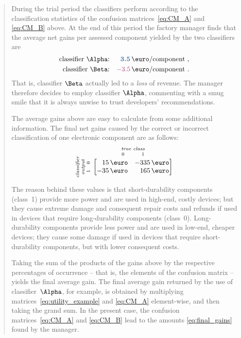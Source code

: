 \documentclass[\ifafour a4paper,12pt,\else a5paper,10pt,\fi%
onecolumn,oneside,article,%
british%
]{memoir}
\theoremstyle{remark}
\theoremstyle{innote}
\renewcommand*{\|}[1][]{\nonscript\:#1\vert\nonscript\:\mathopen{}}
\newcommand*{\good}[1]{\ensuremath{{\color{mypurpleblue}\bm{#1}}}}
\newcommand*{\bad}[1]{\ensuremath{{\color{myredpurple}#1}}}
\begin{document}
\begin{quotation}
During the trial period the classifiers perform according to the classification statistics of the confusion matrices~\eqref{eq:CM_A} and \eqref{eq:CM_B} above. At the end of this period the factory manager finds that the average net gains per assessed component yielded by the two classifiers are
\begin{equation}
  \label{eq:final_gains}
\begin{aligned}
  \text{classifier $\Alpha$:}& & \good{3.5}\,\text{\texteuro/component}&\ , \\
  \text{classifier $\Beta$:}& &\bad{-3.5}\,\text{\texteuro/component}&\ .
\end{aligned}
\end{equation}
That is, classifier $\Beta$ actually led to a \emph{loss} of revenue. The manager therefore decides to employ classifier $\Alpha$, commenting with a smug smile that it is always unwise to trust developers' recommendations.

The average gains above are easy to calculate from some additional information. The final net gains caused by the correct or incorrect classification of one electronic component are as follows:
\begin{equation}
  \label{eq:utility_example}
  \rotatebox[origin=c]{90}{
    \textit{\parbox{\widthof{\scriptsize classifier}}{\centering\scriptsize classifier\\output\\$1\quad 0$}}
    }\ 
    \overbracket[0pt]{
      \begin{bmatrix*}[r]
        15\,\text{\texteuro} & -335\,\text{\texteuro}  \\
        -35\,\text{\texteuro} & 165\,\text{\texteuro}
      \end{bmatrix*}}^{
      \textit{\parbox{\widthof{\scriptsize true class}}{\centering\scriptsize true class\\$0\hspace{3em}1$}}
    }
\end{equation}
The reason behind these values is that short-durability components (class~1) provide more power and are used in high-end, costly devices; but they cause extreme damage and consequent repair costs and refunds if used in devices that require long-durability components (class~0). Long-durability components provide less power and are used in low-end, cheaper devices; they cause some damage if used in devices that require short-durability components, but with lower consequent costs.

Taking the sum of the products of the gains above by the respective percentages of occurrence -- that is, the elements of the confusion matrix -- yields the final average gain. The final average gain returned by the use of classifier~$\Alpha$, for example, is obtained by multiplying matrices~\eqref{eq:utility_example} and \eqref{eq:CM_A} element-wise, and then taking the grand sum. In the present case, the confusion matrices~\eqref{eq:CM_A} and \eqref{eq:CM_B} lead to the amounts \eqref{eq:final_gains} found by the manager.



\end{quotation}
\end{document}
